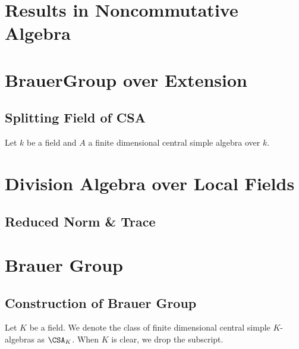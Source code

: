 


\chapter{Results in Noncommutative
  Algebra}\label{sec:results-noncommutative-algebra}









\chapter{BrauerGroup over Extension}

\section{Splitting Field of CSA}
Let $k$ be a field and $A$ a finite dimensional central simple algebra over $k$. 


\chapter{Division Algebra over Local Fields}\label{cha:div_over_local}

\section{Reduced Norm \& Trace}
    


\chapter{Brauer Group}\label{cha:brauer-group}

\section{Construction of Brauer Group}
Let $K$ be a field. We denote the class of finite dimensional central simple $K$-algebras as $\CSA_{K}$. When $K$ is clear, we drop the subscript.

